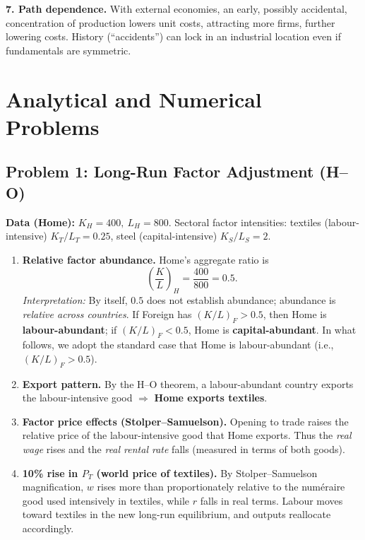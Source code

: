 \documentclass[12pt]{article}
\begin{document}
\medskip
\textbf{7. Path dependence.} With external economies, an early, possibly accidental, concentration of production lowers unit costs, attracting more firms, further lowering costs. History (``accidents'') can lock in an industrial location even if fundamentals are symmetric.

\newpage

\section*{Analytical and Numerical Problems}

\subsection*{Problem 1: Long-Run Factor Adjustment (H--O)}

\textbf{Data (Home):} $K_H=400,\ L_H=800$. Sectoral factor intensities: textiles (labour-intensive) $K_T/L_T=0.25$, steel (capital-intensive) $K_S/L_S=2$.

\begin{enumerate}[label=(\alph*)]
\item \textbf{Relative factor abundance.} Home's aggregate ratio is
\[
\left(\frac{K}{L}\right)_H=\frac{400}{800}=0.5.
\]
\emph{Interpretation:} By itself, $0.5$ does not establish abundance; abundance is \emph{relative across countries}. If Foreign has $(K/L)_F>0.5$, then Home is \textbf{labour-abundant}; if $(K/L)_F<0.5$, Home is \textbf{capital-abundant}. In what follows, we adopt the standard case that Home is labour-abundant (i.e., $(K/L)_F>0.5$).

\item \textbf{Export pattern.} By the H--O theorem, a labour-abundant country exports the labour-intensive good $\Rightarrow$ \textbf{Home exports textiles}.

\item \textbf{Factor price effects (Stolper--Samuelson).} Opening to trade raises the relative price of the labour-intensive good that Home exports. Thus the \emph{real wage} rises and the \emph{real rental rate} falls (measured in terms of both goods).

\item \textbf{10\% rise in $P_T$ (world price of textiles).} By Stolper--Samuelson magnification, $w$ rises more than proportionately relative to the numéraire good used intensively in textiles, while $r$ falls in real terms. Labour moves toward textiles in the new long-run equilibrium, and outputs reallocate accordingly.
\end{enumerate}
\end{document}
